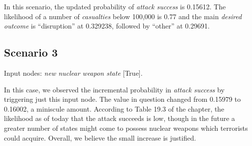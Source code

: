 \documentclass{article}
\begin{document}
{\noindent In this scenario, the updated probability of \textit{attack success} is 0.15612. The likelihood of a number of \textit{casualties} below 100,000 is 0.77 and the main \textit{desired outcome} is “disruption” at 0.329238, followed by “other” at 0.29691. 

\subsection{Scenario 3}
Input nodes: \textit{new nuclear weapon state} [True].

\noindent In this case, we observed the incremental probability in \textit{attack success} by triggering just this input node. The value in question changed from 0.15979 to 0.16002, a miniscule amount. According to Table 19.3 of the chapter\cite{bostromGlobalCatastrophicRisks2011}, the likelihood as of today that the attack succeeds is low, though in the future a greater number of states might come to possess nuclear weapons which terrorists could acquire. Overall, we believe the small increase is justified.

\nocite{GTDGlobalTerrorism}
\nocite{113205Rischio}
\nocite{bastianelliGRUPPITERRORISTICIATTIVI}
\nocite{CouncilCommonPosition}
\nocite{OrganizzazioniTerroristicheSecondo2020}
\nocite{ReducingGreatestRisks}
\printbibliography[heading=bibintoc]}
\end{document}
